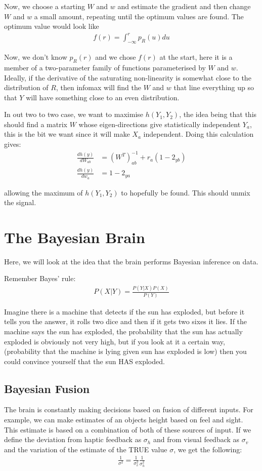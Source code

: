 \documentclass[11pt,a4paper,titlepage,dvipsnames,cmyk]{scrartcl}
\begin{document}
Now, we choose a starting $W$ and $w$ and estimate the gradient and then change $W$ and $w$ a small amount, repeating until the optimum values are found. The optimum value would look like
\begin{align*}
f(r) = \int_{-\infty}^{r} p_R(u) du
\end{align*}

Now, we don't know $p_R(r)$ and we chose $f(r)$ at the start, here it is a member of a two-parameter family of functions parameterised by $W$ and $w$. Ideally, if the derivative of the saturating non-linearity is somewhat close to the distribution of $R$, then infomax will find the $W$ and $w$ that line everything up so that $Y$ will have something close to an even distribution.

In out two to two case, we want to maximise $h(Y_1,Y_2)$, the idea being that this should find a matrix $W$ whose eigen-directions give statistically independent $Y_a$, this is the bit we want since it will make $X_a$ independent. Doing this calculation gives:
\begin{align*}
\frac{dh(y)}{dW_{ab}} &= (W^T)_{ab}^{-1} + r_a (1-2_{yb}) \\
\frac{dh(y)}{dw_a} &= 1-2_{ya}
\end{align*}

allowing the maximum of $h(Y_1,Y_2)$ to hopefully be found. This should unmix the signal.

\section{The Bayesian Brain}
Here, we will look at the idea that the brain performs Bayesian inference on data. 

Remember Bayes' rule:
\begin{align*}
P(X|Y) = \frac{P(Y|X)P(X)}{P(Y)}
\end{align*}

Imagine there is a machine that detects if the sun has exploded, but before it tells you the answer, it rolls two dice and then if it gets two sixes it lies. If the machine says the sun has exploded, the probability that the sun has actually exploded is obviously not very high, but if you look at it a certain way, (probability that the machine is lying given sun has exploded is low) then you could convince yourself that the sun HAS exploded.

\subsection{Bayesian Fusion}
The brain is constantly making decisions based on fusion of different inputs. For example, we can make estimates of an objects height based on feel and sight. This estimate is based on a combination of both of these sources of input. If we define the deviation from haptic feedback as $\sigma_h$ and from visual feedback as $\sigma_v$ and the variation of the estimate of the TRUE value $\sigma$, we get the following:
\begin{align*}
\frac{1}{\sigma^2} = \frac{1}{\sigma_v^2} \frac{1}{\sigma_h^2}
\end{align*}
\end{document}
